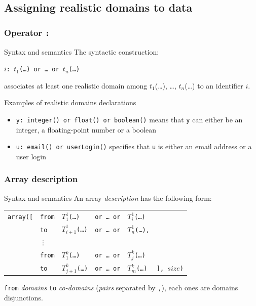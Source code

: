 \documentclass[10pt]{beamer}
\newcommand{\code}[1]{\texttt{#1}}
\begin{document}
\subsection{Assigning realistic domains to data}

\begin{frame}
\frametitle{Operator \code{:}}

\begin{block}{Syntax and semantics}
The syntactic construction:
\begin{center}
\code{$i$: $t_1$(\dots) or \dots~or $t_n$(\dots)}
\end{center}
associates at least one realistic domain among $t_1$(\dots), \dots,
$t_n$(\dots) to an identifier $i$.
\end{block}

\begin{exampleblock}{Examples of realistic domains declarations}
\begin{itemize}
\item \code{y: integer() or float() or boolean()} means that \code{y} can
either be an integer, a floating-point number or a boolean
\item \code{u: email() or userLogin()} specifies that \code{u} is either an
email address or a user login
\end{itemize}
\end{exampleblock}

\end{frame}

\begin{frame}
\frametitle{Array description}

\begin{block}{Syntax and semantics}
An array {\em description} has the following form:
\begin{center}
\begin{tabular}{llllll}
  \code{array([} &
  \code{from} &
  \code{$T^1_1$(\dots)} &
  \code{or \dots~or} &
  \code{$T^1_i$(\dots)} \\
  &
  \code{to} &
  \code{$T^1_{i+1}$(\dots)} &
  \code{or \dots~or} &
  \code{$T^1_n$(\dots),} \\
  &
  \code{\vdots} \\
  &
  \code{from} &
  \code{$T^k_1$(\dots)} &
  \code{or \dots~or} &
  \code{$T^k_j$(\dots)} \\
  &
  \code{to} &
  \code{$T^k_{j+1}$(\dots)} &
  \code{or \dots~or} &
  \code{$T^k_m$(\dots)} &
  \code{], $size$)}
\end{tabular}
\end{center}
\code{from} {\em domains} \code{to} {\em co-domains} ({\em pairs} separated by
\code{,}), each ones are domains disjunctions.
\end{block}

\end{frame}
\end{document}
